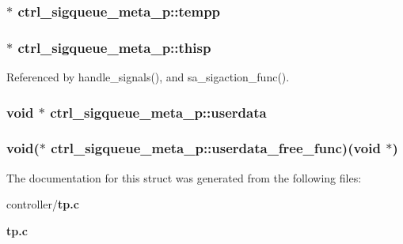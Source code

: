 \subsubsection[{tempp}]{ $\ast$ {\bf ctrl\_\-sigqueue\_\-meta\_\-p::tempp}}\label{structctrl__sigqueue__meta__p_af9495ac9c4780c1b0224d61bc627c899}
\subsubsection[{thisp}]{ $\ast$ {\bf ctrl\_\-sigqueue\_\-meta\_\-p::thisp}}\label{structctrl__sigqueue__meta__p_a54a1ff68fa07af43680ff652523c19b1}


Referenced by handle\_\-signals(), and sa\_\-sigaction\_\-func().

\subsubsection[{userdata}]{\setlength{\rightskip}{0pt plus 5cm}void $\ast$ {\bf ctrl\_\-sigqueue\_\-meta\_\-p::userdata}}\label{structctrl__sigqueue__meta__p_a70125ec72740ec9f94202ee5ca1956bf}
\subsubsection[{userdata\_\-free\_\-func}]{\setlength{\rightskip}{0pt plus 5cm}void($\ast$ {\bf ctrl\_\-sigqueue\_\-meta\_\-p::userdata\_\-free\_\-func})(void $\ast$)}\label{structctrl__sigqueue__meta__p_a02b366a7c81790dfe246b24e55b2d196}


The documentation for this struct was generated from the following files:\begin{DoxyCompactItemize}
\item 
controller/{\bf tp.c}\item 
{\bf tp.c}\end{DoxyCompactItemize}
